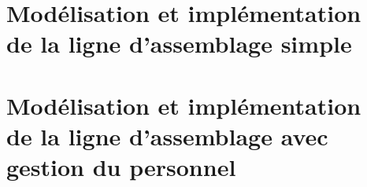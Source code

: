 \part{Modélisation et implémentation \\de la ligne d'assemblage simple}








\part{Modélisation et implémentation \\de la ligne d'assemblage avec gestion du personnel}





